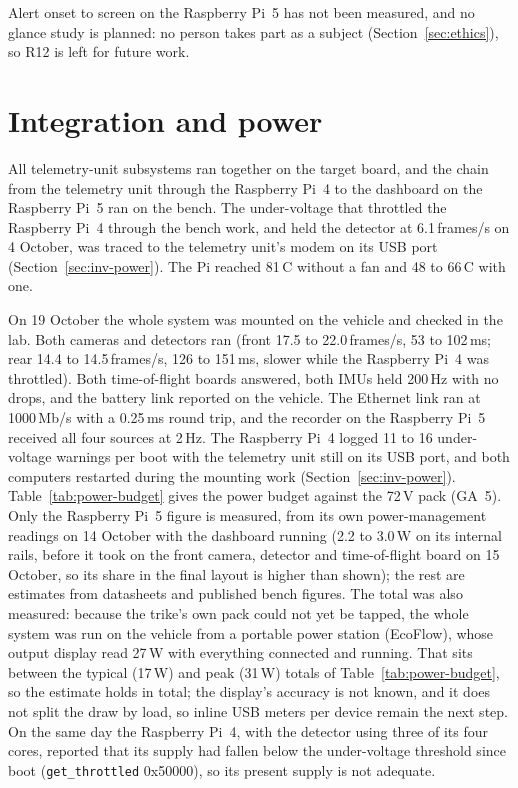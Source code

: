 Alert onset to screen on the Raspberry Pi~5 has not been measured, and no glance study is planned: no person takes part as a subject (Section~\ref{sec:ethics}), so R12 is left for future work.

\section{Integration and power}
\label{sec:resx-power}

All telemetry-unit subsystems ran together on the target board, and the chain from the telemetry unit through the Raspberry Pi~4 to the dashboard on the Raspberry Pi~5 ran on the bench. The under-voltage that throttled the Raspberry Pi~4 through the bench work, and held the detector at 6.1\,frames/s on 4 October, was traced to the telemetry unit's modem on its USB port (Section~\ref{sec:inv-power}). The Pi reached 81\,\textdegree C without a fan and 48 to 66\,\textdegree C with one.

On 19 October the whole system was mounted on the vehicle and checked in the lab. Both cameras and detectors ran (front 17.5 to 22.0\,frames/s, 53 to 102\,ms; rear 14.4 to 14.5\,frames/s, 126 to 151\,ms, slower while the Raspberry Pi~4 was throttled). Both time-of-flight boards answered, both IMUs held 200\,Hz with no drops, and the battery link reported on the vehicle. The Ethernet link ran at 1000\,Mb/s with a 0.25\,ms round trip, and the recorder on the Raspberry Pi~5 received all four sources at 2\,Hz. The Raspberry Pi~4 logged 11 to 16 under-voltage warnings per boot with the telemetry unit still on its USB port, and both computers restarted during the mounting work (Section~\ref{sec:inv-power}). Table~\ref{tab:power-budget} gives the power budget against the 72\,V pack (GA~5). Only the Raspberry Pi~5 figure is measured, from its own power-management readings on 14 October with the dashboard running (2.2 to 3.0\,W on its internal rails, before it took on the front camera, detector and time-of-flight board on 15 October, so its share in the final layout is higher than shown); the rest are estimates from datasheets and published bench figures. The total was also measured: because the trike's own pack could not yet be tapped, the whole system was run on the vehicle from a portable power station (EcoFlow), whose output display read 27\,W with everything connected and running. That sits between the typical (17\,W) and peak (31\,W) totals of Table~\ref{tab:power-budget}, so the estimate holds in total; the display's accuracy is not known, and it does not split the draw by load, so inline USB meters per device remain the next step. On the same day the Raspberry Pi~4, with the detector using three of its four cores, reported that its supply had fallen below the under-voltage threshold since boot (\texttt{get\_throttled} 0x50000), so its present supply is not adequate.

